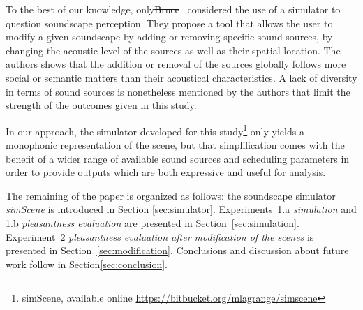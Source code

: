 \documentclass[12pt]{elsarticle}
\providecommand{\DIFadd}[1]{{\protect\color{blue}\uwave{#1}}} %
\providecommand{\DIFdel}[1]{{\protect\color{red}\sout{#1}}}                      %
\providecommand{\DIFaddbegin}{} %
\providecommand{\DIFaddend}{} %
\providecommand{\DIFdelbegin}{} %
\providecommand{\DIFdelend}{} %
\begin{document}
To the best of our knowledge, only\DIFdelbegin \DIFdel{Bruce}\DIFdelend ~\cite{bruce2009development,bruce2014effects} considered the use of a simulator to question soundscape perception. They propose a tool that allows the user to modify a given soundscape by adding or removing specific sound sources, by changing the acoustic level of the sources as well as their spatial location. The authors shows that the addition or removal of the sources globally follows more social or semantic matters than their acoustical characteristics. A lack of diversity in terms of sound sources is nonetheless mentioned by the authors that limit the strength of the outcomes given in this study.


In our approach, the simulator developed for this study\footnote{simScene, available online \url{https://bitbucket.org/mlagrange/simscene}} only yields a monophonic representation of the scene, but that simplification comes with the benefit of a wider range of available sound sources and scheduling parameters in order to provide outputs which are both expressive and useful for analysis.


The remaining of the paper is organized as follows: the soundscape simulator \emph{simScene} is introduced in Section \ref{sec:simulator}. Experiments~1.a \emph{simulation} and  1.b \emph{pleasantness evaluation} are presented in Section~\ref{sec:simulation}. Experiment~2 \emph{pleasantness evaluation after modification of the scenes} is presented in Section~\ref{sec:modification}. Conclusions and discussion about future work follow in Section\DIFaddbegin \DIFadd{~}\DIFaddend \ref{sec:conclusion}.

\end{document}

